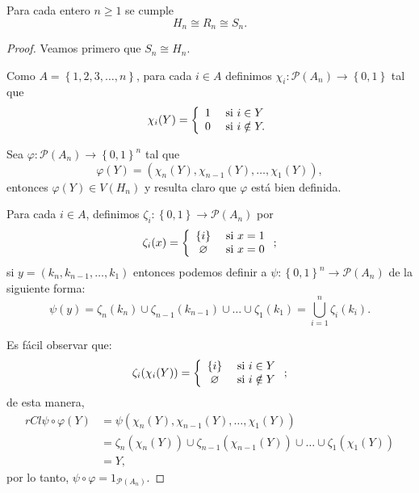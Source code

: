 \begin{teorema}
    Para cada entero $n \ge 1$ se cumple \[H_n \cong R_n \cong S_n.\]
\end{teorema}


\begin{proof}
    Veamos primero que $S_n \cong H_n$.

    Como $A=\left\{1,2,3, \dots, n\right\}$, para cada $i \in A$ definimos  $\chi_i: \mathcal{P}(A_n) \to \left\{0,
    1\right\}$ tal que  $$\chi_i(Y) = \left\{ \begin{array}{cl}
                                                  1 & \textnormal{ si } i \in Y \\ 0 & \textnormal{ si } i \notin Y.
    \end{array} \right.$$

    Sea $\varphi: \mathcal{P}(A_n) \to \left\{0,1\right\}^n$ tal que $$\varphi(Y)=(\chi_n(Y), \chi_{n-1}(Y), \dots,
    \chi_1(Y)),$$ entonces $\varphi(Y) \in V(H_n)$ y resulta claro que $\varphi$ est\'a bien definida.

    Para cada $i \in A$, definimos $\zeta_i: \left\{0,1\right\} \to \mathcal{P}(A_n) $ por  $$\zeta_i(x) = \left\{
    \begin{array}{cl}
        \left\{i\right\} & \textnormal{ si } x=1 \\ \varnothing & \textnormal{ si } x=0
    \end{array} \right.;$$  si $y=(k_n, k_{n-1}, \dots, k_1)$ entonces podemos definir a  $\psi:\left\{0,
    1\right\}^{n} \to \mathcal{P}(A_n)$ de la siguiente forma: $$\psi(y)=\zeta_n(k_n) \cup\zeta_{n-1}(k_{n-1}) \cup
    \dots \cup \zeta_1(k_1) = \bigcup_{i=1}^n \zeta_i(k_i).$$

    Es f\'acil observar que: $$\zeta_i (\chi_i(Y)) =  \left\{ \begin{array}{cl}
                                                                  \left\{ i \right\} & \textnormal{ si } i \in Y    \\
                                                                  \varnothing        & \textnormal{ si } i \notin Y
    \end{array} \right.;$$  de esta manera,
    \begin{align*}{rCl}
        \psi \circ \varphi(Y) &= \psi(\chi_n(Y), \chi_{n-1}(Y), \dots, \chi_1(Y)) \\
        &= \zeta_n (\chi_n(Y)) \cup \zeta_{n-1}(\chi_{n-1}(Y)) \cup \dots \cup \zeta_1(\chi_1(Y)) \\
        &= Y,
    \end{align*}
    por lo tanto, $\psi \circ \varphi = 1_{\mathcal{P}(A_n)}$.


\end{proof}
